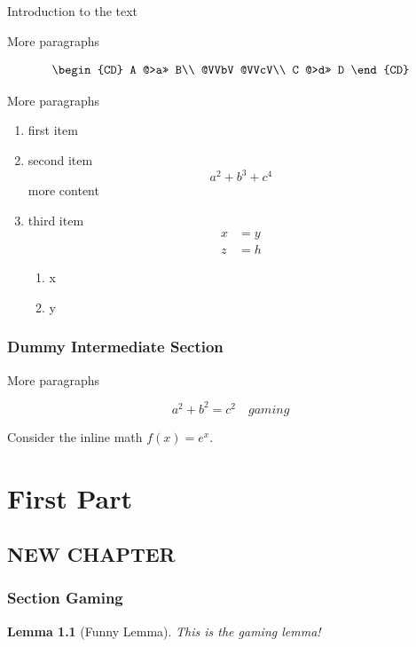 \usepackage{package}

\newtheorem{lemma}{Lemma}[section]

\newcommand{\gamer}{gaming}

Introduction to the text

More paragraphs

\[
    \begin{CD}
        A @>a>> B\\
        @VVbV @VVcV\\
        C @>d>> D
    \end{CD}
\]

More paragraphs

\begin{enumerate}
    \item[(c)] first item
    \item second item
    \[
        a^2 + b^3 + c^4
    \]
    more content
    \item third item
    \begin{align*}
        x &= y \\
        z &= h
    \end{align*}
    \begin{enumerate}
        \item x
        \item y
    \end{enumerate}
\end{enumerate}

\section{Dummy Intermediate Section}

More paragraphs

\[
    a^2 + b^2 = c^2 \quad \gamer
\]

Consider the inline math $f(x) = e^x$.

\part{First Part}
\label{part:1}

\chapter{NEW CHAPTER}
\label{chapter:new}

\section{Section Gaming}
\begin{lemma}[Funny Lemma]
    \label{lemma:gaming}
    This is the gaming lemma!
\end{lemma}

